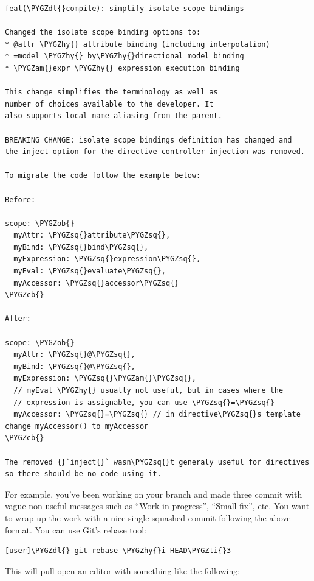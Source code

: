 \documentclass[letterpaper,10pt,english]{sphinxmanual}
\def\PYGZob{\char`\{}
\def\PYGZcb{\char`\}}
\def\PYGZam{\char`\&}
\def\PYGZdl{\char`\$}
\def\PYGZhy{\char`\-}
\def\PYGZsq{\char`\'}
\def\PYGZti{\char`\~}
\renewcommand\PYGZsq{\textquotesingle}
\begin{document}
\begin{Verbatim}[commandchars=\\\{\}]
feat(\PYGZdl{}compile): simplify isolate scope bindings

Changed the isolate scope binding options to:
* @attr \PYGZhy{} attribute binding (including interpolation)
* =model \PYGZhy{} by\PYGZhy{}directional model binding
* \PYGZam{}expr \PYGZhy{} expression execution binding

This change simplifies the terminology as well as
number of choices available to the developer. It
also supports local name aliasing from the parent.

BREAKING CHANGE: isolate scope bindings definition has changed and
the inject option for the directive controller injection was removed.

To migrate the code follow the example below:

Before:

scope: \PYGZob{}
  myAttr: \PYGZsq{}attribute\PYGZsq{},
  myBind: \PYGZsq{}bind\PYGZsq{},
  myExpression: \PYGZsq{}expression\PYGZsq{},
  myEval: \PYGZsq{}evaluate\PYGZsq{},
  myAccessor: \PYGZsq{}accessor\PYGZsq{}
\PYGZcb{}

After:

scope: \PYGZob{}
  myAttr: \PYGZsq{}@\PYGZsq{},
  myBind: \PYGZsq{}@\PYGZsq{},
  myExpression: \PYGZsq{}\PYGZam{}\PYGZsq{},
  // myEval \PYGZhy{} usually not useful, but in cases where the
  // expression is assignable, you can use \PYGZsq{}=\PYGZsq{}
  myAccessor: \PYGZsq{}=\PYGZsq{} // in directive\PYGZsq{}s template change myAccessor() to myAccessor
\PYGZcb{}

The removed {}`inject{}` wasn\PYGZsq{}t generaly useful for directives so there should be no code using it.
\end{Verbatim}

For example, you've been working on your branch and made three commit
with vague non-useful messages such as ``Work in progress'', ``Small
fix'', etc. You want to wrap up the work with a nice single squashed
commit following the above format. You can use Git's rebase tool:

\begin{Verbatim}[commandchars=\\\{\}]
[user]\PYGZdl{} git rebase \PYGZhy{}i HEAD\PYGZti{}3
\end{Verbatim}

This will pull open an editor with something like the following:
\end{document}
